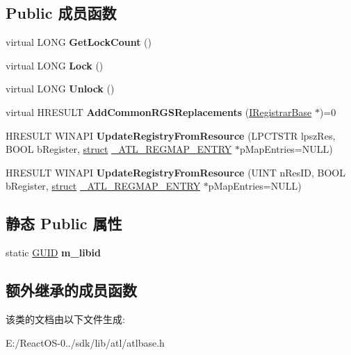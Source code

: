 \subsection*{Public 成员函数}
\begin{DoxyCompactItemize}
\item 
\mbox{\label{class_a_t_l_1_1_c_atl_module_abf044c451b7b1137638b4b30fb2bfeac}} 
virtual L\+O\+NG {\bfseries Get\+Lock\+Count} ()
\item 
\mbox{\label{class_a_t_l_1_1_c_atl_module_acea96344066890fd66060386d7f2e97a}} 
virtual L\+O\+NG {\bfseries Lock} ()
\item 
\mbox{\label{class_a_t_l_1_1_c_atl_module_a0e20bc433497bf5db2b57c4a325f7110}} 
virtual L\+O\+NG {\bfseries Unlock} ()
\item 
\mbox{\label{class_a_t_l_1_1_c_atl_module_aca31a80d669016a895f389f33e64e0e4}} 
virtual H\+R\+E\+S\+U\+LT {\bfseries Add\+Common\+R\+G\+S\+Replacements} (\hyperlink{interface_i_registrar_base}{I\+Registrar\+Base} $\ast$)=0
\item 
\mbox{\label{class_a_t_l_1_1_c_atl_module_aac69bb783e8557739c9ba9828c211520}} 
H\+R\+E\+S\+U\+LT W\+I\+N\+A\+PI {\bfseries Update\+Registry\+From\+Resource} (L\+P\+C\+T\+S\+TR lpsz\+Res, B\+O\+OL b\+Register, \hyperlink{interfacestruct}{struct} \hyperlink{struct_a_t_l_1_1___a_t_l___r_e_g_m_a_p___e_n_t_r_y}{\+\_\+\+A\+T\+L\+\_\+\+R\+E\+G\+M\+A\+P\+\_\+\+E\+N\+T\+RY} $\ast$p\+Map\+Entries=N\+U\+LL)
\item 
\mbox{\label{class_a_t_l_1_1_c_atl_module_a7065a2e7ae8d7e3d91f9a88cbbbbc8a8}} 
H\+R\+E\+S\+U\+LT W\+I\+N\+A\+PI {\bfseries Update\+Registry\+From\+Resource} (U\+I\+NT n\+Res\+ID, B\+O\+OL b\+Register, \hyperlink{interfacestruct}{struct} \hyperlink{struct_a_t_l_1_1___a_t_l___r_e_g_m_a_p___e_n_t_r_y}{\+\_\+\+A\+T\+L\+\_\+\+R\+E\+G\+M\+A\+P\+\_\+\+E\+N\+T\+RY} $\ast$p\+Map\+Entries=N\+U\+LL)
\end{DoxyCompactItemize}
\subsection*{静态 Public 属性}
\begin{DoxyCompactItemize}
\item 
\mbox{\label{class_a_t_l_1_1_c_atl_module_a63ea875f2f7113db12015d96f380fa2f}} 
static \hyperlink{interface_g_u_i_d}{G\+U\+ID} {\bfseries m\+\_\+libid}
\end{DoxyCompactItemize}
\subsection*{额外继承的成员函数}


该类的文档由以下文件生成\+:\begin{DoxyCompactItemize}
\item 
E\+:/\+React\+O\+S-\/0../sdk/lib/atl/atlbase.\+h\end{DoxyCompactItemize}
